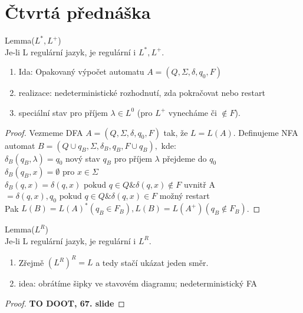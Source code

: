 \documentclass[../main.tex]{subfiles}
\begin{document}
\section{Čtvrtá přednáška}

\begin{theorem}
    Lemma($L^*,L^+$)\\

    Je-li L regulární jazyk, je regulární i $L^*, L^+$.
    \begin{enumerate}
        \item Ida: Opakovaný výpočet automatu $A = (Q, \Sigma, \delta, q_0, F)$
        \item realizace: nedeterministické rozhodnutí, zda pokračovat nebo restart
        \item speciální stav pro příjem $\lambda \in L^0$ (pro $L^+$ vynecháme či $\notin F$).
    \end{enumerate}
    \begin{proof}
        Vezmeme DFA $A = (Q, \Sigma, \delta, q_0, F)$ tak, že $L = L(A)$.
        Definujeme NFA automat $B = (Q\cup {q_B}, \Sigma, \delta_B, {q_B}, F\cup {q_B}),$ kde:\\
        $\delta_B(q_B,\lambda) = {q_0}$ nový stav $q_B$ pro příjem $\lambda$ přejdeme do $q_0$\\
        $\delta_B(q_B,x) = \emptyset$ pro $x\in \Sigma$\\
        $\delta_B(q,x) = {\delta(q,x)}$ pokud $q \in Q \& \delta(q,x) \notin F$ uvnitř A\\
        $ = {\delta(q,x),q_0}$ pokud $q \in Q \& \delta(q,x) \in F$ možný restart\\
        Pak $L(B) = L(A)^* (q_B \in F_B), L(B) = L(A^+)(q_B\notin F_B)$.
    \end{proof}
\end{theorem}

\begin{theorem}
    Lemma($L^R$)\\

    Je-li L regulární jazyk, je regulární i $L^R$.
    \begin{enumerate}
        \item Zřejmě $(L^R)^R = L$ a tedy stačí ukázat jeden směr.
        \item idea: obrátíme šipky ve stavovém diagramu; nedeterministický FA
    \end{enumerate}
    \begin{proof}
        \textbf{TO DOOT, 67. slide}
    \end{proof}
\end{theorem}
\end{document}
